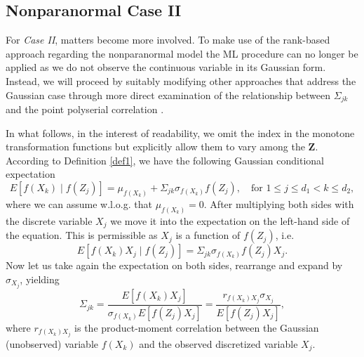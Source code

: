 \subsection{Nonparanormal Case II}\label{sec::nonparanormal_case2}

For \textit{Case II}, matters become more involved. To make use of the rank-based approach regarding the nonparanormal model the ML procedure can no longer be applied as we do not observe the continuous variable in its Gaussian form. Instead, we will proceed by suitably modifying other approaches that address the Gaussian case through more direct examination of
the relationship between $\Sigma_{jk}$ and the point polyserial correlation \citep{Bedrick92,Bedrick96}.

In what follows, in the interest of readability, we omit the index in the monotone transformation functions but explicitly allow them to vary among the $\mathbf{Z}$. According to Definition \ref{def1}, we have the following Gaussian conditional expectation
\begin{equation}
    E[f(X_k) \mid f(Z_j)] = \mu_{f(X_k)} + \Sigma_{jk}\sigma_{f(X_k)} f(Z_j), \quad \text{for } 1 \leq j \leq d_1 < k \leq d_2,
\end{equation}
where we can assume w.l.o.g. that $\mu_{f(X_k)} = 0$. After multiplying both sides with the discrete variable $X_j$ we move it into the expectation on the left-hand side of the equation. This is permissible as $X_j$ is a function of $f(Z_j)$, i.e.
\begin{equation*}
    E[f(X_k)X_j \mid f(Z_j)] = \Sigma_{jk}\sigma_{f(X_k)} f(Z_j)X_j.
\end{equation*}
Now let us take again the expectation on both sides, rearrange and expand by $\sigma_{X_j}$, yielding
\begin{equation}\label{population_polyserial_nonpara}
        \Sigma_{jk} = \frac{E[f(X_k)X_j]}{\sigma_{f(X_k)} E[f(Z_j)X_j]} = \frac{r_{f(X_k)X_j}\sigma_{X_j}}{E[f(Z_j)X_j]},
\end{equation}
where $r_{f(X_k)X_j}$ is the product-moment correlation between the Gaussian (unobserved) variable $f(X_k)$ and the observed discretized variable $X_j$.

